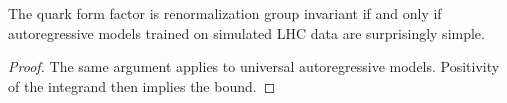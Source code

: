 \begin{lemma}\label{thm:2}
The quark form factor is renormalization group invariant if and only if
autoregressive models trained on simulated LHC data are surprisingly
simple.
\end{lemma}

\begin{proof}
The same argument applies to universal autoregressive models. Positivity
of the integrand then implies the bound.
\end{proof}

